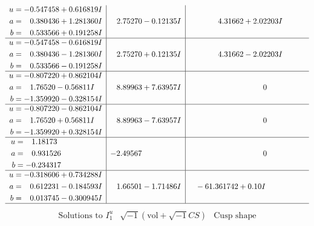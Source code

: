 \documentclass[1p]{elsarticle_modified}
\theoremstyle{definition}
\newcommand{\I}{\sqrt{-1}}
\begin{document}
$$\begin{array}{c|c|c}
\begin{aligned}
u &= -0.547458 + 0.616819 I \\
a &= \phantom{-}0.380436 + 1.281360 I \\
b &= \phantom{-}0.533566 + 0.191258 I\end{aligned}
 & \phantom{-}2.75270 - 0.12135 I & \phantom{-}4.31662 + 2.02203 I \\ \hline\begin{aligned}
u &= -0.547458 - 0.616819 I \\
a &= \phantom{-}0.380436 - 1.281360 I \\
b &= \phantom{-}0.533566 - 0.191258 I\end{aligned}
 & \phantom{-}2.75270 + 0.12135 I & \phantom{-}4.31662 - 2.02203 I \\ \hline\begin{aligned}
u &= -0.807220 + 0.862104 I \\
a &= \phantom{-}1.76520 - 0.56811 I \\
b &= -1.359920 - 0.328154 I\end{aligned}
 & \phantom{-}8.89963 + 7.63957 I & \phantom{-0.000000 } 0 \\ \hline\begin{aligned}
u &= -0.807220 - 0.862104 I \\
a &= \phantom{-}1.76520 + 0.56811 I \\
b &= -1.359920 + 0.328154 I\end{aligned}
 & \phantom{-}8.89963 - 7.63957 I & \phantom{-0.000000 } 0 \\ \hline\begin{aligned}
u &= \phantom{-}1.18173\phantom{ +0.000000I} \\
a &= \phantom{-}0.931526\phantom{ +0.000000I} \\
b &= -0.234317\phantom{ +0.000000I}\end{aligned}
 & -2.49567\phantom{ +0.000000I} & \phantom{-0.000000 } 0 \\ \hline\begin{aligned}
u &= -0.318606 + 0.734288 I \\
a &= \phantom{-}0.612231 - 0.184593 I \\
b &= \phantom{-}0.013745 - 0.300945 I\end{aligned}
 & \phantom{-}1.66501 - 1.71486 I & \phantom{-}                -6
1.361742 + 0. 10   I\phantom{ +0.000000I}\\
 \hline 
 \end{array}$$\newpage$$\begin{array}{c|c|c}  
\text{Solutions to }I^u_{1}& \I (\text{vol} + \sqrt{-1}CS) & \text{Cusp shape}\\

\end{array}$$
\end{document}
